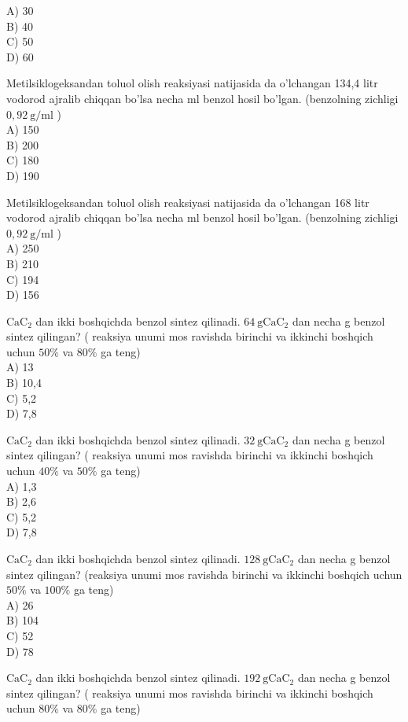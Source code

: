 A) 30\\
B) 40\\
C) 50\\
D) 60
  \item Metilsiklogeksandan toluol olish reaksiyasi natijasida da o'lchangan 134,4 litr vodorod ajralib chiqqan bo'lsa necha ml benzol hosil bo'lgan. (benzolning zichligi $0,92 \mathrm{~g} / \mathrm{ml}$ )\\
A) 150\\
B) 200\\
C) 180\\
D) 190
  \item Metilsiklogeksandan toluol olish reaksiyasi natijasida da o'lchangan 168 litr vodorod ajralib chiqqan bo'lsa necha ml benzol hosil bo'lgan. (benzolning zichligi $0,92 \mathrm{~g} / \mathrm{ml}$ )\\
A) 250\\
B) 210\\
C) 194\\
D) 156
  \item $\mathrm{CaC}_{2}$ dan ikki boshqichda benzol sintez qilinadi. $64 \mathrm{~g} \mathrm{CaC}_{2}$ dan necha g benzol sintez qilingan? ( reaksiya unumi mos ravishda birinchi va ikkinchi boshqich uchun $50 \%$ va $80 \%$ ga teng)\\
A) 13\\
B) 10,4\\
C) 5,2\\
D) 7,8
  \item $\mathrm{CaC}_{2}$ dan ikki boshqichda benzol sintez qilinadi. $32 \mathrm{~g} \mathrm{CaC}_{2}$ dan necha g benzol sintez qilingan? ( reaksiya unumi mos ravishda birinchi va ikkinchi boshqich uchun $40 \%$ va $50 \%$ ga teng)\\
A) 1,3\\
B) 2,6\\
C) 5,2\\
D) 7,8
  \item $\mathrm{Ca} \mathrm{C}_{2}$ dan ikki boshqichda benzol sintez qilinadi. $128 \mathrm{~g} \mathrm{CaC}_{2}$ dan necha g benzol sintez qilingan? (reaksiya unumi mos ravishda birinchi va ikkinchi boshqich uchun $50 \%$ va $100 \%$ ga teng)\\
A) 26\\
B) 104\\
C) 52\\
D) 78
  \item $\mathrm{CaC}_{2}$ dan ikki boshqichda benzol sintez qilinadi. $192 \mathrm{~g} \mathrm{CaC}_{2}$ dan necha g benzol sintez qilingan? ( reaksiya unumi mos ravishda birinchi va ikkinchi boshqich uchun $80 \%$ va $80 \%$ ga teng)\\
